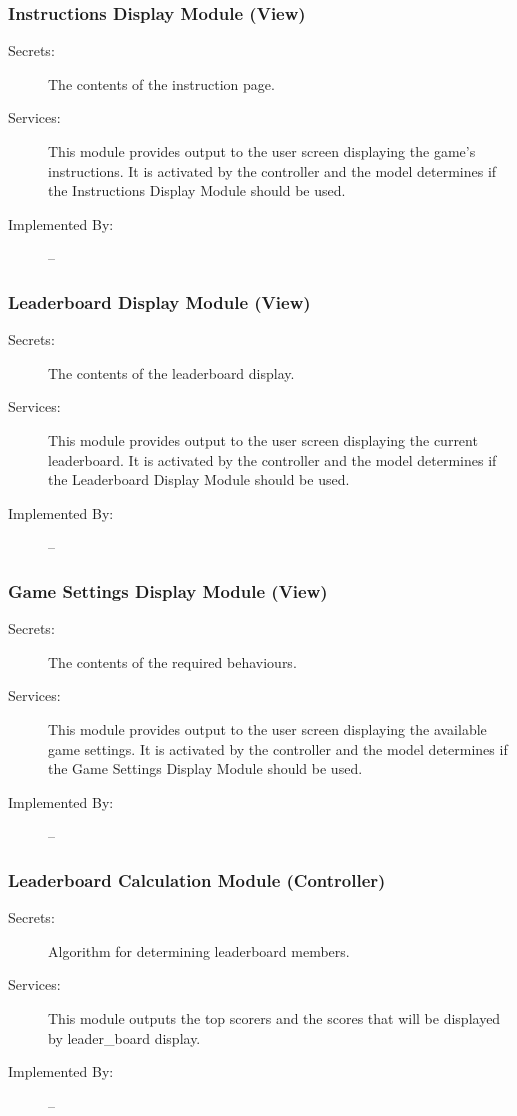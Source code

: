 \documentclass[12pt, titlepage]{article}
\begin{document}
\subsubsection{Instructions Display Module (View)}
\begin{description}
\item[Secrets:]The contents of the instruction page. 
\item[Services:] This module provides output to the user screen displaying the game's instructions. It is activated by the controller and the model determines if the Instructions Display Module should be used. 
\item[Implemented By:] --
\end{description}

\subsubsection{Leaderboard Display Module (View)}
\begin{description}
\item[Secrets:]The contents of the leaderboard display.
\item[Services:] This module provides output to the user screen displaying the current leaderboard. It is activated by the controller and the model determines if the Leaderboard Display Module should be used.
\item[Implemented By:] --
\end{description}

\subsubsection{Game Settings Display Module (View)}
\begin{description}
\item[Secrets:]The contents of the required behaviours.
\item[Services:] This module provides output to the user screen displaying the available game settings. It is activated by the controller and the model determines if the Game Settings Display Module should be used. 
\item[Implemented By:] --
\end{description}

\subsubsection{Leaderboard Calculation Module (Controller)}
\begin{description}
\item[Secrets:] Algorithm for determining leaderboard members.
\item[Services:] This module outputs the top scorers and the scores that will be displayed by leader\_board display.
\item[Implemented By:] --
\end{description}
\end{document}
